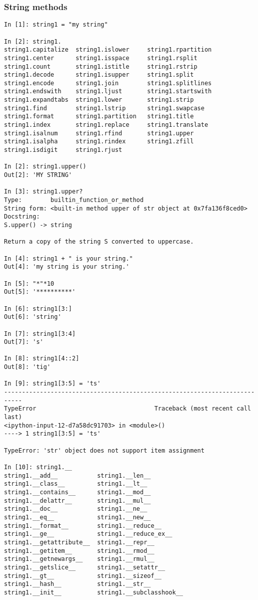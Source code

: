 \subsubsection{String methods}
\begin{verbatim}
In [1]: string1 = "my string"

In [2]: string1.
string1.capitalize  string1.islower     string1.rpartition
string1.center      string1.isspace     string1.rsplit
string1.count       string1.istitle     string1.rstrip
string1.decode      string1.isupper     string1.split
string1.encode      string1.join        string1.splitlines
string1.endswith    string1.ljust       string1.startswith
string1.expandtabs  string1.lower       string1.strip
string1.find        string1.lstrip      string1.swapcase
string1.format      string1.partition   string1.title
string1.index       string1.replace     string1.translate
string1.isalnum     string1.rfind       string1.upper
string1.isalpha     string1.rindex      string1.zfill
string1.isdigit     string1.rjust       

In [2]: string1.upper()
Out[2]: 'MY STRING'

In [3]: string1.upper?
Type:        builtin_function_or_method
String form: <built-in method upper of str object at 0x7fa136f8ced0>
Docstring:
S.upper() -> string

Return a copy of the string S converted to uppercase.

In [4]: string1 + " is your string."
Out[4]: 'my string is your string.'

In [5]: "*"*10
Out[5]: '**********'

In [6]: string1[3:]
Out[6]: 'string'

In [7]: string1[3:4] 
Out[7]: 's'

In [8]: string1[4::2]
Out[8]: 'tig'

In [9]: string1[3:5] = 'ts'
---------------------------------------------------------------------------
TypeError                                 Traceback (most recent call last)
<ipython-input-12-d7a58dc91703> in <module>()
----> 1 string1[3:5] = 'ts'

TypeError: 'str' object does not support item assignment

In [10]: string1.__
string1.__add__           string1.__len__
string1.__class__         string1.__lt__
string1.__contains__      string1.__mod__
string1.__delattr__       string1.__mul__
string1.__doc__           string1.__ne__
string1.__eq__            string1.__new__
string1.__format__        string1.__reduce__
string1.__ge__            string1.__reduce_ex__
string1.__getattribute__  string1.__repr__
string1.__getitem__       string1.__rmod__
string1.__getnewargs__    string1.__rmul__
string1.__getslice__      string1.__setattr__
string1.__gt__            string1.__sizeof__
string1.__hash__          string1.__str__
string1.__init__          string1.__subclasshook__
\end{verbatim}

